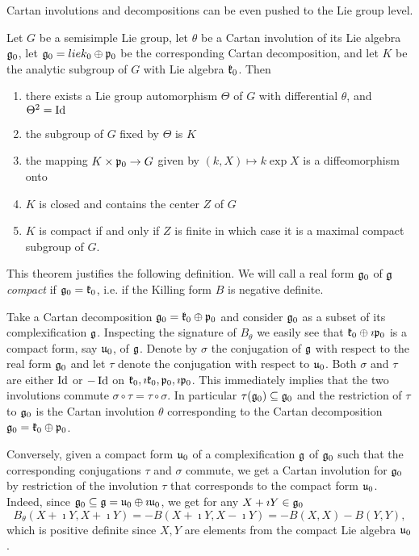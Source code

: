 Cartan involutions and decompositions can be even pushed to the Lie group level.
\begin{theorem}
 Let $G$ be a semisimple Lie group, let $\theta$ be a Cartan involution of its Lie algebra $\mathfrak{g}_0$, let $\mathfrak{g}_0 = lie{k}_0 \oplus \mathfrak{p}_0$ be the corresponding Cartan decomposition, and let $K$ be the analytic subgroup of $G$ with Lie algebra $\mathfrak{k}_0$. Then
 \begin{enumerate}
  \item there exists a Lie group automorphism $\Theta$ of $G$ with differential $\theta$, and $\Theta^2=\operatorname{\mathrm{Id}}$
  \item the subgroup of $G$ fixed by $\Theta$ is $K$
  \item the mapping $K\times \mathfrak{p}_0 \to G$ given by $(k,X)\mapsto k \exp{X}$ is a diffeomorphism onto
  \item $K$ is closed and contains the center $Z$ of $G$
  \item $K$ is compact if and only if $Z$ is finite in which case it is a maximal compact subgroup of $G$.
 \end{enumerate}
\end{theorem}

This theorem justifies the following definition. We will call a real form $\mathfrak{g}_0$ of $\mathfrak{g}$ \emph{compact} if $\mathfrak{g}_0 = \mathfrak{k}_0$, i.e. if the Killing form $B$ is negative definite.

Take a Cartan decomposition $\mathfrak{g}_0 = \mathfrak{k}_0 \oplus \mathfrak{p}_0$ and consider $\mathfrak{g}_0$ as a subset of its complexification $\mathfrak{g}$. Inspecting the signature of $B_\theta$ we easily see that $\mathfrak{k}_0\oplus \imath \mathfrak{p}_0$ is a compact form, say $\mathfrak{u}_0$, of $\mathfrak{g}$. Denote by $\sigma$ the conjugation of $\mathfrak{g}$ with respect to the real form $\mathfrak{g}_0$ and let $\tau$ denote the conjugation with respect to $\mathfrak{u}_0$. Both $\sigma$ and $\tau$ are either $\operatorname{\mathrm{Id}}$ or $-\operatorname{\mathrm{Id}}$ on $\mathfrak{k}_0, \imath \mathfrak{k}_0, \mathfrak{p}_0, \imath \mathfrak{p}_0$. This immediately implies that the two involutions commute $\sigma \circ \tau = \tau \circ \sigma$. In particular $\tau (\mathfrak{g}_0) \subseteq \mathfrak{g}_0$ and the restriction of $\tau$ to $\mathfrak{g}_0$ is the Cartan involution $\theta$ corresponding to the Cartan decomposition $\mathfrak{g}_0=\mathfrak{k}_0 \oplus \mathfrak{p}_0$.

Conversely, given a compact form $\mathfrak{u}_0$ of a complexification $\mathfrak{g}$ of $\mathfrak{g}_0$ such that the corresponding conjugations $\tau$ and $\sigma$ commute, we get a Cartan involution for $\mathfrak{g}_0$ by restriction of the involution $\tau$ that corresponds to the compact form $\mathfrak{u}_0$. Indeed, since $\mathfrak{g}_0 \subseteq \mathfrak{g} = \mathfrak{u}_0 \oplus \imath \mathfrak{u}_0$, we get for any $X+\imath Y\in\mathfrak{g}_0$
\[
 B_\theta (X+\imath Y,X+\imath Y) = -B(X+\imath Y,X-\imath Y) = -B(X,X) - B(Y,Y),
\]
which is positive definite since $X,Y$ are elements from the compact Lie algebra $\mathfrak{u}_0$.

